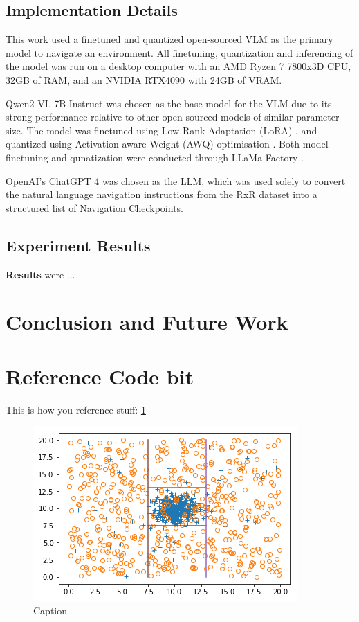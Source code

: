 \documentclass{svproc}
\begin{document}
\subsection{Implementation Details}
    This work used a finetuned and quantized open-sourced VLM as the primary model to navigate an environment. All finetuning, quantization and inferencing of the model was run on a desktop computer with an AMD Ryzen 7 7800x3D CPU, 32GB of RAM, and an NVIDIA RTX4090 with 24GB of VRAM.

    Qwen2-VL-7B-Instruct \cite{Qwen-VL, Qwen2VL} was chosen as the base model for the VLM due to its strong performance relative to other open-sourced models \cite{vlm_leaderboard} of similar parameter size.
    The model was finetuned using Low Rank Adaptation (LoRA) \cite{LoRA}, and quantized using Activation-aware Weight (AWQ) optimisation \cite{MLSYS2024_42a452cb}. Both model finetuning and qunatization were conducted through LLaMa-Factory \cite{zheng2024llamafactory}.

    OpenAI's ChatGPT 4 \cite{openai2024gpt4technicalreport} was chosen as the LLM, which was used solely to convert the natural language navigation instructions from the RxR dataset into a structured list of Navigation Checkpoints.

\subsection{Experiment Results}
    \textbf{Results} were ...

\section{Conclusion and Future Work}

\section{Reference Code bit}
    This is how you reference stuff: \ref{fig:fig2}


    \begin{figure}
        \centering
        \includegraphics[scale=.75]{figures/DecisionBoundary.png}
        \caption{Caption}
        \label{fig:fig2}
    \end{figure}
\end{document}

